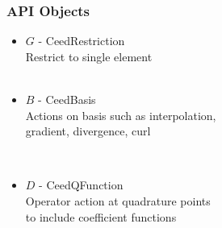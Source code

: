 \documentclass{beamer}
\begin{document}

\begin{frame}
\begin{center}
\frametitle{API Objects}

\begin{itemize}

\item $G$ - CeedRestriction\\

\hspace{6mm} Restrict to single element\\

~\\

\item {\color{blue(ncs)} $B$} - CeedBasis\\

\hspace{6mm} Actions on basis such as interpolation,\\

\hspace{6mm} gradient, divergence, curl

~\\

\item {\color{applegreen} $D$} - CeedQFunction\\

\hspace{6mm} Operator action at quadrature points\\

\hspace{6mm} to include coefficient functions

\end{itemize}

\end{center}
\end{frame}

\end{document}
